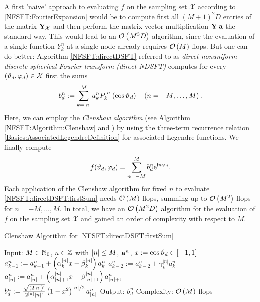 A first 'naive' approach to evaluating $f$ on the sampling set $\mathcal{X}$ according to \eqref{NFSFT:FourierExpansion} would be to compute first all $(M+1)^2D$
entries of the matrix $\mathbf{Y}_{\mathcal{X}}$ and then perform the matrix-vector multiplication $\mathbf{Y} \: \mathbf{a}$ the standard way. This would lead to an $\mathcal{O}\left(M^3D\right)$ algorithm, since the evaluation of a single function 
$Y_{k}^n$ at a single node already requires $\mathcal{O}\left(M\right)$ flops.
But one can do better: Algorithm \ref{NFSFT:directDSFT} referred 
to as \emph{direct nonuniform discrete spherical Fourier transform (direct NDSFT)} computes 
for every $\left(\vartheta_{d},\varphi_{d}\right) \in \mathcal{X}$ first the sums 
\begin{equation}
  \label{NFSFT:directDSFT:firstSum}
  b^{n}_{d} := \sum_{k=\left\vert n\right\vert}^M a_{k}^n P_{k}^{\left\vert n\right\vert}{\hspace{-0.4ex}}\left(\cos\vartheta_{d}\right) \quad \left(n=-M,\ldots,M\right). 
\end{equation}
Here, we can employ the \emph{Clenshaw algorithm} (see Algorithm \ref{NFSFT:Algorithm:Clenshaw} and \cite[pp. 184]{prtevefl}) 
by using the three-term recurrence relation \eqref{Basics:AssociatedLegendreDefinition}
for associated Legendre functions. We finally compute
\begin{equation}
  \label{NFSFT:directNDSFT:secondSum}
  f{\hspace{-0.4ex}}\left(\vartheta_{d},\varphi_{d}\right) = \sum_{n=-M}^M b^{n}_d \mbox{\rm{e}}^{\mbox{\scriptsize\rm{i}} n \varphi_{d}}.
\end{equation}
Each application of the Clenshaw algorithm for fixed $n$ to evaluate \eqref{NFSFT:directDSFT:firstSum} needs $\mathcal{O}\left(M\right)$ 
flops, summing up to $\mathcal{O}\left(M^2\right)$ flops for $n = -M,\ldots,M$. In 
total, we have an $\mathcal{O}\left(M^2 D\right)$ algorithm for the evaluation of $f$ on the sampling set $\mathcal{X}$ and gained an order of complexity with respect to $M$. 
\begin{algorithm}[tb]
  \caption{Clenshaw Algorithm for \eqref{NFSFT:directDSFT:firstSum}}
  \label{NFSFT:Algorithm:Clenshaw}    
  \begin{algorithmic}
    \STATE  Input: $M \in \mathbb{N}_{0}$, $n \in \mathbb{Z}$ with $\left\vert n\right\vert \le M$, $\mathbf{a}^n$, $x := \cos\vartheta_{d} \in \left[\left.-1,1\right]\right.$
    \STATE
      \STATE $a_{k-1}^n := a_{k-1}^n + \left(\alpha_{k}^{|n|} x + \beta_{k}^{|n|}\right) a_{k}^n$
      \STATE $a_{k-2}^n := a_{k-2}^n + \gamma_{k}^{|n|} a_{k}^n$
    \ENDFOR
    \STATE $a_{\left\vert n\right\vert}^n := a_{\left\vert n\right\vert}^n + \left(\alpha_{\left\vert n\right\vert+1}^{|n|} x + \beta_{\left\vert n\right\vert+1}^{|n|}\right) a_{\left\vert n\right\vert+1}^n$\\[0.5ex]
    \STATE $b_{d}^n := \frac{\sqrt{(2|n|)!}}{2^{|n|} |n|!} \left(1-x^2\right)^{|n|/2} a_{\left\vert n\right\vert}^n$
    \STATE
    \STATE Output: $b_{d}^n$
    \STATE Complexity: $\mathcal{O}\left(M\right)$ flops
\end{algorithmic}
\end{algorithm}
